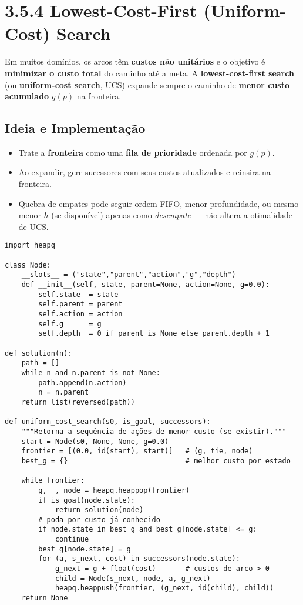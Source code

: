 \documentclass[9pt,a4paper]{extarticle}
\begin{document}
\section{3.5.4 Lowest-Cost-First (Uniform-Cost) Search}

Em muitos domínios, os arcos têm \textbf{custos não unitários} e o objetivo é \textbf{minimizar o custo total} do caminho até a meta.
A \textbf{lowest-cost-first search} (ou \textbf{uniform-cost search}, UCS) expande sempre o caminho de \textbf{menor custo acumulado} $g(p)$ na fronteira.

\subsection*{Ideia e Implementação}
\begin{itemize}
  \item Trate a \textbf{fronteira} como uma \textbf{fila de prioridade} ordenada por $g(p)$.
  \item Ao expandir, gere sucessores com seus custos atualizados e reinsira na fronteira.
  \item Quebra de empates pode seguir ordem FIFO, menor profundidade, ou mesmo menor $h$ (se disponível) apenas como \emph{desempate} --- não altera a otimalidade de UCS.
\end{itemize}

\begin{lstlisting}
import heapq

class Node:
    __slots__ = ("state","parent","action","g","depth")
    def __init__(self, state, parent=None, action=None, g=0.0):
        self.state  = state
        self.parent = parent
        self.action = action
        self.g      = g
        self.depth  = 0 if parent is None else parent.depth + 1

def solution(n):
    path = []
    while n and n.parent is not None:
        path.append(n.action)
        n = n.parent
    return list(reversed(path))

def uniform_cost_search(s0, is_goal, successors):
    """Retorna a sequência de ações de menor custo (se existir)."""
    start = Node(s0, None, None, g=0.0)
    frontier = [(0.0, id(start), start)]   # (g, tie, node)
    best_g = {}                            # melhor custo por estado

    while frontier:
        g, _, node = heapq.heappop(frontier)
        if is_goal(node.state):
            return solution(node)
        # poda por custo já conhecido
        if node.state in best_g and best_g[node.state] <= g:
            continue
        best_g[node.state] = g
        for (a, s_next, cost) in successors(node.state):
            g_next = g + float(cost)       # custos de arco > 0
            child = Node(s_next, node, a, g_next)
            heapq.heappush(frontier, (g_next, id(child), child))
    return None
\end{lstlisting}
\end{document}

